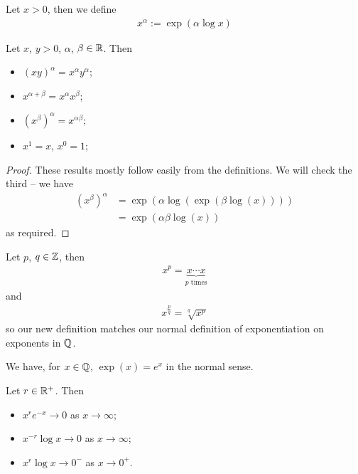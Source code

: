 \documentclass{../template/note}
\begin{document}
    \begin{definition}[Exponentiation]
        Let \(x > 0\), then we define
        \begin{align*}
            x^\alpha := \exp(\alpha \log x)
        \end{align*}
    \end{definition}
    
    \begin{lemma}
        Let \(x\), \(y > 0\), \(\alpha\), \(\beta \in \mathbb R\). Then
        \begin{itemize}
            \item \((xy)^\alpha = x^\alpha y^\alpha\);
            \item \(x^{\alpha+\beta} = x^\alpha x^\beta\);
            \item \((x^\beta)^\alpha = x^{\alpha\beta}\);
            \item \(x^1 = x\), \(x^0 = 1\);
        \end{itemize}
    \end{lemma}
    
    \begin{proof}
        These results mostly follow easily from the definitions. We will check the third -- we have
        \begin{align*}
            (x^\beta)^\alpha &= \exp(\alpha \log(\exp(\beta \log(x)))) \\
            &= \exp(\alpha \beta \log(x))
        \end{align*}
        as required.        
    \end{proof}
    
    \begin{corollary}
        Let \(p\), \(q \in \mathbb Z\), then
        \begin{align*}
            x^p = \underbrace{x \cdots x}_{p \text{ times}}
        \end{align*}
        and
        \begin{align*}
            x^{\frac p q} = \sqrt[q]{x^p}
        \end{align*}
        so our new definition matches our normal definition of exponentiation on exponents in \(\mathbb Q\).
    \end{corollary}
    
    \begin{corollary}
        We have, for \(x \in \mathbb Q\), \(\exp(x) = e^x\) in the normal sense.
    \end{corollary}
    
    \begin{proposition}
        Let \(r \in \mathbb R^+\). Then
        \begin{itemize}
            \item \(x^r e^{-x} \to 0\) as \(x \to \infty\);
            \item \(x^{-r} \log x \to 0\) as \(x \to \infty\);
            \item \(x^r \log x \to 0^-\) as \(x \to 0^+\).
        \end{itemize}
    \end{proposition}
    
\end{document}
